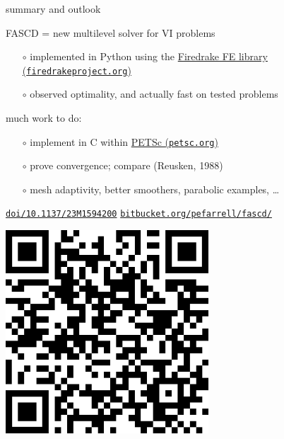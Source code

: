\documentclass[svgnames,
               hyperref={colorlinks,citecolor=DeepPink4,linkcolor=FireBrick,urlcolor=Maroon},
               usepdftitle=false]  %
               {beamer}
\begin{document}
\begin{frame}{summary and outlook}

\begin{itemize}
\item FASCD = new multilevel solver for VI problems
    \begin{itemize}
    \item[$\circ$] implemented in Python using the \href{https://www.firedrakeproject.org/}{Firedrake FE library (\texttt{firedrakeproject.org})}
    \item[$\circ$] observed optimality, and actually fast on tested problems
    \end{itemize}
{\small
\item much work to do:
    \begin{itemize}
    \item[$\circ$] implement in C within \href{https://petsc.org/release/}{PETSc (\texttt{petsc.org})}
    \item[$\circ$] prove convergence; compare (Reusken, 1988)
    \item[$\circ$] mesh adaptivity, better smoothers, parabolic examples, \dots
    \end{itemize}
}
\end{itemize}

\bigskip\bigskip
\footnotesize

\noindent \href{https://epubs.siam.org/doi/10.1137/23M1594200}{\texttt{doi/10.1137/23M1594200}} \hfill \href{https://bitbucket.org/pefarrell/fascd/}{\texttt{bitbucket.org/pefarrell/fascd/}}

\smallskip
\begin{minipage}[T]{0.35\textwidth}
\vspace{0pt}

\includegraphics[width=0.57\textwidth]{figs/QRbuelerfarrell.png}


\end{minipage}
\end{frame}
\end{document}
